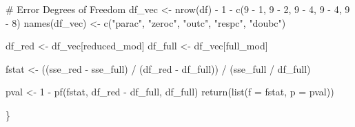 \documentclass[
  letterpaper,
  DIV=11,
  numbers=noendperiod]{scrartcl}
\newenvironment{Shaded}{\begin{snugshade}}{\end{snugshade}}
\newcommand{\AttributeTok}[1]{\textcolor[rgb]{0.40,0.45,0.13}{#1}}
\newcommand{\CommentTok}[1]{\textcolor[rgb]{0.37,0.37,0.37}{#1}}
\newcommand{\DecValTok}[1]{\textcolor[rgb]{0.68,0.00,0.00}{#1}}
\newcommand{\FunctionTok}[1]{\textcolor[rgb]{0.28,0.35,0.67}{#1}}
\newcommand{\NormalTok}[1]{\textcolor[rgb]{0.00,0.23,0.31}{#1}}
\newcommand{\OtherTok}[1]{\textcolor[rgb]{0.00,0.23,0.31}{#1}}
\newcommand{\SpecialCharTok}[1]{\textcolor[rgb]{0.37,0.37,0.37}{#1}}
\newcommand{\StringTok}[1]{\textcolor[rgb]{0.13,0.47,0.30}{#1}}
\begin{document}
\begin{Shaded}
\begin{Highlighting}[]
  \CommentTok{\# Error Degrees of Freedom}
\NormalTok{  df\_vec }\OtherTok{\textless{}{-}} \FunctionTok{nrow}\NormalTok{(df) }\SpecialCharTok{{-}} \DecValTok{1} \SpecialCharTok{{-}} \FunctionTok{c}\NormalTok{(}\DecValTok{9} \SpecialCharTok{{-}} \DecValTok{1}\NormalTok{, }\DecValTok{9} \SpecialCharTok{{-}} \DecValTok{2}\NormalTok{, }\DecValTok{9} \SpecialCharTok{{-}} \DecValTok{4}\NormalTok{, }\DecValTok{9} \SpecialCharTok{{-}} \DecValTok{4}\NormalTok{, }\DecValTok{9} \SpecialCharTok{{-}} \DecValTok{8}\NormalTok{)}
  \FunctionTok{names}\NormalTok{(df\_vec) }\OtherTok{\textless{}{-}} \FunctionTok{c}\NormalTok{(}\StringTok{"parac"}\NormalTok{, }\StringTok{"zeroc"}\NormalTok{, }\StringTok{"outc"}\NormalTok{, }\StringTok{"respc"}\NormalTok{, }\StringTok{"doubc"}\NormalTok{)}

\NormalTok{  df\_red }\OtherTok{\textless{}{-}}\NormalTok{ df\_vec[reduced\_mod]}
\NormalTok{  df\_full }\OtherTok{\textless{}{-}}\NormalTok{ df\_vec[full\_mod]}

\NormalTok{  fstat }\OtherTok{\textless{}{-}}\NormalTok{ ((sse\_red }\SpecialCharTok{{-}}\NormalTok{ sse\_full) }\SpecialCharTok{/}\NormalTok{ (df\_red }\SpecialCharTok{{-}}\NormalTok{ df\_full)) }\SpecialCharTok{/}\NormalTok{ (sse\_full }\SpecialCharTok{/}\NormalTok{ df\_full)}

\NormalTok{  pval }\OtherTok{\textless{}{-}} \DecValTok{1} \SpecialCharTok{{-}} \FunctionTok{pf}\NormalTok{(fstat, df\_red }\SpecialCharTok{{-}}\NormalTok{ df\_full, df\_full)}
  \FunctionTok{return}\NormalTok{(}\FunctionTok{list}\NormalTok{(}\AttributeTok{f =}\NormalTok{ fstat, }\AttributeTok{p =}\NormalTok{ pval))}

\NormalTok{\}}
\end{Highlighting}
\end{Shaded}
\end{document}
